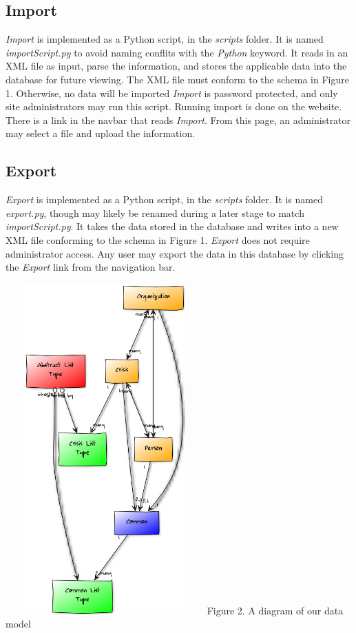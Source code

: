\documentclass[12pt]{report}
\begin{document}
\subsection*{Import}
\hfill


\emph{Import} is implemented as a Python script, in the \emph{scripts} folder.
It is named \emph{importScript.py} to avoid naming conflits with the \emph{Python} keyword.
It reads in an XML file as input, parse the information, and stores the applicable data into the database for future viewing.
The XML file must conform to the schema in Figure 1.
Otherwise, no data will be imported
\emph{Import} is password protected, and only site administrators may run this script.
Running import is done on the website.
There is a link in the navbar that reads \emph{Import}.
From this page, an administrator may select a file and upload the information.


\subsection*{Export}
\hfill


\emph{Export} is implemented as a Python script, in the \emph{scripts} folder.
It is named \emph{export.py}, though may likely be renamed during a later stage to match \emph{importScript.py}.
It takes the data stored in the database and writes into a new XML file conforming to the schema in Figure 1.
\emph{Export} does not require administrator access.
Any user may export the data in this database by clicking the \emph{Export} link from the navigation bar.


\hfill


\includegraphics*[width=3in,height=5in]{dataModelDiagram.png}
\newline
\footnotesize
Figure 2. A diagram of our data model %
\normalsize
\newpage
\end{document}
